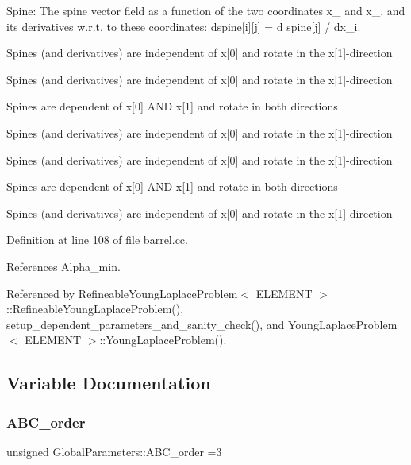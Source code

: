 Spine\+: The spine vector field as a function of the two coordinates x\+\_ and x\+\_, and its derivatives w.\+r.\+t. to these coordinates\+: dspine\mbox{[}i\mbox{]}\mbox{[}j\mbox{]} = d spine\mbox{[}j\mbox{]} / dx\+\_\+i. 

Spines (and derivatives) are independent of x\mbox{[}0\mbox{]} and rotate in the x\mbox{[}1\mbox{]}-\/direction

Spines (and derivatives) are independent of x\mbox{[}0\mbox{]} and rotate in the x\mbox{[}1\mbox{]}-\/direction

Spines are dependent of x\mbox{[}0\mbox{]} A\+ND x\mbox{[}1\mbox{]} and rotate in both directions

Spines (and derivatives) are independent of x\mbox{[}0\mbox{]} and rotate in the x\mbox{[}1\mbox{]}-\/direction

Spines (and derivatives) are independent of x\mbox{[}0\mbox{]} and rotate in the x\mbox{[}1\mbox{]}-\/direction

Spines are dependent of x\mbox{[}0\mbox{]} A\+ND x\mbox{[}1\mbox{]} and rotate in both directions

Spines (and derivatives) are independent of x\mbox{[}0\mbox{]} and rotate in the x\mbox{[}1\mbox{]}-\/direction 

Definition at line 108 of file barrel.\+cc.



References Alpha\+\_\+min.



Referenced by Refineable\+Young\+Laplace\+Problem$<$ E\+L\+E\+M\+E\+N\+T $>$\+::\+Refineable\+Young\+Laplace\+Problem(), setup\+\_\+dependent\+\_\+parameters\+\_\+and\+\_\+sanity\+\_\+check(), and Young\+Laplace\+Problem$<$ E\+L\+E\+M\+E\+N\+T $>$\+::\+Young\+Laplace\+Problem().



\subsection{Variable Documentation}
\mbox{\label{namespaceGlobalParameters_a552eed3548a269715a95161ad3c4b96a}} 
\subsubsection{\texorpdfstring{A\+B\+C\+\_\+order}{ABC\_order}}
{\footnotesize\ttfamily unsigned Global\+Parameters\+::\+A\+B\+C\+\_\+order =3}



